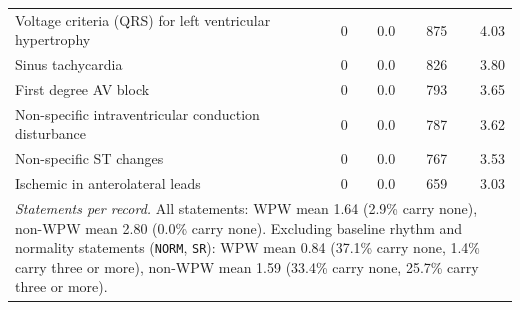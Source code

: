 \documentclass[11pt]{article}
\begin{document}
\begin{table}[htbp]
\begin{tabular}{lrrrr}
Voltage criteria (QRS) for left ventricular hypertrophy & 0 & 0.0 & 875 & 4.03 \\
Sinus tachycardia & 0 & 0.0 & 826 & 3.80 \\
First degree AV block & 0 & 0.0 & 793 & 3.65 \\
Non-specific intraventricular conduction disturbance & 0 & 0.0 & 787 & 3.62 \\
Non-specific ST changes & 0 & 0.0 & 767 & 3.53 \\
Ischemic in anterolateral leads & 0 & 0.0 & 659 & 3.03 \\
\midrule
\multicolumn{5}{p{0.92\linewidth}}{\emph{Statements per record.} All statements: WPW mean 1.64 (2.9\% carry none), non-WPW mean 2.80 (0.0\% carry none). Excluding baseline rhythm and normality statements (\texttt{NORM}, \texttt{SR}): WPW mean 0.84 (37.1\% carry none, 1.4\% carry three or more), non-WPW mean 1.59 (33.4\% carry none, 25.7\% carry three or more).} \\
\bottomrule
\end{tabular}
\end{table}
\end{document}
